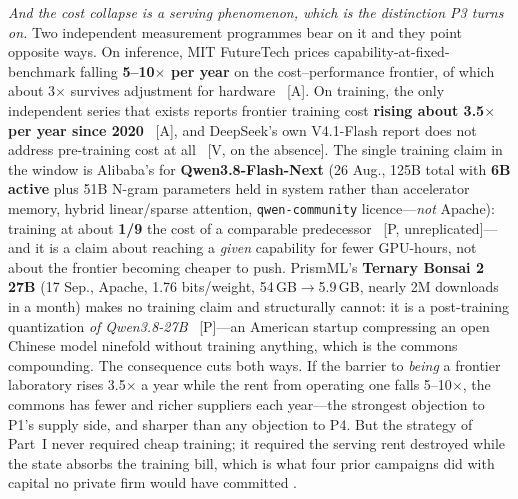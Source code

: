 \emph{And the cost collapse is a serving phenomenon, which is the distinction P3 turns on.} Two independent measurement programmes bear on it and they point opposite ways. On inference, MIT FutureTech prices capability-at-fixed-benchmark falling \textbf{5--10$\times$ per year} on the cost--performance frontier, of which about 3$\times$ survives adjustment for hardware~\cite{futuretech-inference} [A]. On training, the only independent series that exists reports frontier training cost \textbf{rising about 3.5$\times$ per year since 2020}~\cite{epoch-training-cost} [A], and DeepSeek's own V4.1-Flash report does not address pre-training cost at all~\cite{v41flash-nopretrain} [V, on the absence]. The single training claim in the window is Alibaba's for \textbf{Qwen3.8-Flash-Next} (26 Aug., 125B total with \textbf{6B active} plus 51B N-gram parameters held in system rather than accelerator memory, hybrid linear/sparse attention, \texttt{qwen-community} licence---\emph{not} Apache): training at about \textbf{1/9} the cost of a comparable predecessor~\cite{qwen38-flash-next,qwen-training-ninth} [P, unreplicated]---and it is a claim about reaching a \emph{given} capability for fewer GPU-hours, not about the frontier becoming cheaper to push. PrismML's \textbf{Ternary Bonsai 2 27B} (17 Sep., Apache, 1.76 bits/weight, 54\,GB$\to$5.9\,GB, nearly 2M downloads in a month) makes no training claim and structurally cannot: it is a post-training quantization \emph{of Qwen3.8-27B}~\cite{bonsai2} [P]---an American startup compressing an open Chinese model ninefold without training anything, which is the commons compounding. The consequence cuts both ways. If the barrier to \emph{being} a frontier laboratory rises 3.5$\times$ a year while the rent from operating one falls 5--10$\times$, the commons has fewer and richer suppliers each year---the strongest objection to P1's supply side, and sharper than any objection to P4. But the strategy of Part~I never required cheap training; it required the serving rent destroyed while the state absorbs the training bill, which is what four prior campaigns did with capital no private firm would have committed .

